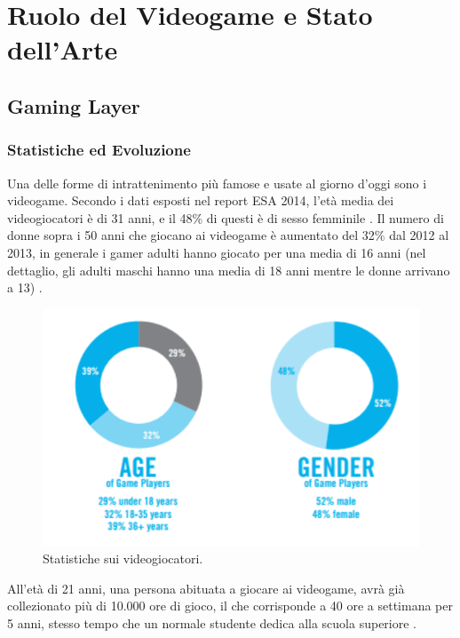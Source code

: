 \chapter {Ruolo del Videogame e Stato dell'Arte}
\label{chap:gaming_layer}

\section{Gaming Layer}

\subsection{Statistiche ed Evoluzione}

Una delle forme di intrattenimento più famose e usate al giorno d'oggi sono i videogame. Secondo i dati esposti nel report ESA 2014, l'età media dei videogiocatori è di 31 anni, e il 48\% di questi è di sesso femminile \cite{esareport-stats}.
Il numero di donne sopra i 50 anni che giocano ai videogame è aumentato del 32\% dal 2012 al 2013, in generale i gamer adulti hanno giocato per una media di 16 anni (nel dettaglio, gli adulti maschi hanno una media di 18 anni mentre le donne arrivano a 13) \cite{seriousgamingementor}.

\begin{figure}[h]
\centerline{\includegraphics[scale=0.45]{images/statoarte/statsgamers.png}}
\caption{Statistiche sui videogiocatori.}
\label{fig:statsgamers}
\end{figure}

All'età di 21 anni, una persona abituata a giocare ai videogame, avrà già collezionato più di 10.000 ore di gioco, il che corrisponde a 40 ore a settimana per 5 anni, stesso tempo che un normale studente dedica alla scuola superiore \cite{seriousgamingementor}.

